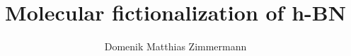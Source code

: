 \author{Domenik Matthias Zimmermann}
\title{Molecular fictionalization of h-BN}
\usepackage[utf8]{inputenc}
\usepackage[T1]{fontenc}
\usepackage{lmodern}
\usepackage[english]{babel}
\usepackage{csquotes}
\usepackage{amsmath}
\usepackage{textcomp}		%
\usepackage{amsfonts}
\usepackage{amssymb}
\usepackage{graphicx}
\usepackage{xhfill}			%
\usepackage{braket}		%
\usepackage{siunitx}
\DeclareSIUnit{}
\usepackage[hidelinks,breaklinks=true]{hyperref}
\usepackage[section]{placeins} %
\usepackage{subfigure}
\usepackage{wrapfig}
\usepackage{caption}
\usepackage{microtype}
\usepackage{multicol}
\usepackage{multirow}
\usepackage{makeidx}
\makeindex
\usepackage[style=numeric		%
,backend=biber
]{biblatex} 	

\addto\bibsetup{\setlength{\emergencystretch}{1.5em}} 	

\usepackage{xcolor}
\usepackage[draft=false]{scrlayer-scrpage}		%
\pagestyle{scrheadings}

